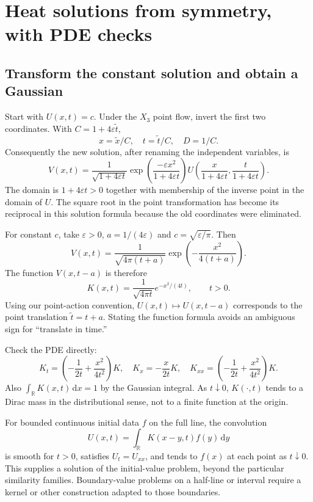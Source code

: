 \documentclass[11pt,a4paper]{article}
\numberwithin{equation}{section}
\theoremstyle{definition}
\theoremstyle{plain}
\theoremstyle{remark}
\newcommand{\R}{\mathbb R}
\newcommand{\dd}{\,\mathrm d}
\begin{document}
\section{Heat solutions from symmetry, with PDE checks}\label{sec:heat-solutions}
\subsection{Transform the constant solution and obtain a Gaussian}
Start with $U(x,t)=c$. Under the $X_3$ point flow, invert the first two coordinates. With $C=1+4\varepsilon\widetilde t$,
\[
x=\widetilde x/C,\quad t=\widetilde t/C,\quad D=1/C.
\]
Consequently the new solution, after renaming the independent variables, is
\begin{equation}\label{eq:heat-transform}
V(x,t)=\frac1{\sqrt{1+4\varepsilon t}}
\exp\left(\frac{-\varepsilon x^2}{1+4\varepsilon t}\right)
U\left(\frac{x}{1+4\varepsilon t},\frac{t}{1+4\varepsilon t}\right).
\end{equation}
The domain is $1+4\varepsilon t>0$ together with membership of the inverse point in the domain of $U$. The square root in the point transformation has become its reciprocal in this solution formula because the old coordinates were eliminated.

For constant $c$, take $\varepsilon>0$, $a=1/(4\varepsilon)$ and $c=\sqrt{\varepsilon/\pi}$. Then
\[
V(x,t)=\frac1{\sqrt{4\pi(t+a)}}\exp\left(-\frac{x^2}{4(t+a)}\right).
\]
The function $V(x,t-a)$ is therefore
\begin{equation}\label{eq:kernel}
\boxed{K(x,t)=\frac1{\sqrt{4\pi t}}e^{-x^2/(4t)},\qquad t>0.}
\end{equation}
Using our point-action convention, $U(x,t)\mapsto U(x,t-a)$ corresponds to the point translation $\widetilde t=t+a$. Stating the function formula avoids an ambiguous sign for ``translate in time.''

Check the PDE directly:
\[
K_t=\left(-\frac1{2t}+\frac{x^2}{4t^2}\right)K,
\quad K_x=-\frac{x}{2t}K,
\quad K_{xx}=\left(-\frac1{2t}+\frac{x^2}{4t^2}\right)K.
\]
Also $\int_{\R}K(x,t)\dd x=1$ by the Gaussian integral. As $t\downarrow0$, $K(\cdot,t)$ tends to a Dirac mass in the distributional sense, not to a finite function at the origin.

For bounded continuous initial data $f$ on the full line, the convolution
\[
U(x,t)=\int_{\R}K(x-y,t)f(y)\dd y
\]
is smooth for $t>0$, satisfies $U_t=U_{xx}$, and tends to $f(x)$ at each point as $t\downarrow0$. This supplies a solution of the initial-value problem, beyond the particular similarity families. Boundary-value problems on a half-line or interval require a kernel or other construction adapted to those boundaries.
\end{document}
